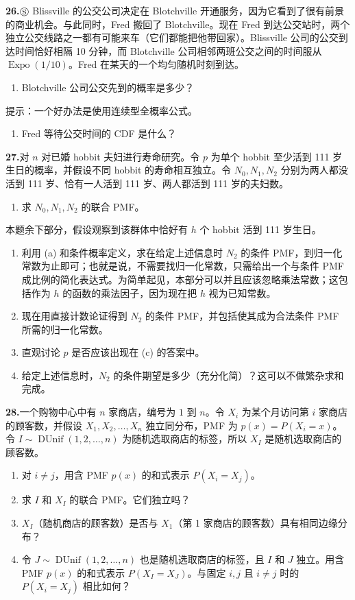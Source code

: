 \documentclass[UTF8,12pt,a4paper,fontset=fandol]{ctexart}
\begin{document}
\noindent\textbf{26.}\quad $\circledS$ Blissville 的公交公司决定在 Blotchville 开通服务，因为它看到了很有前景的商业机会。与此同时，Fred 搬回了 Blotchville。现在 Fred 到达公交站时，两个独立公交线路之一都有可能来车（它们都能把他带回家）。Blissville 公司的公交到达时间恰好相隔 10 分钟，而 Blotchville 公司相邻两班公交之间的时间服从 $\operatorname{Expo}(1/10)$。Fred 在某天的一个均匀随机时刻到达。
\begin{enumerate}
  \item[(a)] Blotchville 公司公交先到的概率是多少？
\end{enumerate}
提示：一个好办法是使用连续型全概率公式。
\begin{enumerate}
  \item[(b)] Fred 等待公交时间的 CDF 是什么？
\end{enumerate}

\noindent\textbf{27.}\quad 对 $n$ 对已婚 hobbit 夫妇进行寿命研究。令 $p$ 为单个 hobbit 至少活到 111 岁生日的概率，并假设不同 hobbit 的寿命相互独立。令 $N_0,N_1,N_2$ 分别为两人都没活到 111 岁、恰有一人活到 111 岁、两人都活到 111 岁的夫妇数。
\begin{enumerate}
  \item[(a)] 求 $N_0,N_1,N_2$ 的联合 PMF。
\end{enumerate}
本题余下部分，假设观察到该群体中恰好有 $h$ 个 hobbit 活到 111 岁生日。
\begin{enumerate}
  \item[(b)] 利用 (a) 和条件概率定义，求在给定上述信息时 $N_2$ 的条件 PMF，到归一化常数为止即可；也就是说，不需要找归一化常数，只需给出一个与条件 PMF 成比例的简化表达式。为简单起见，本部分可以并且应该忽略乘法常数；这包括作为 $h$ 的函数的乘法因子，因为现在把 $h$ 视为已知常数。
  \item[(c)] 现在用直接计数论证得到 $N_2$ 的条件 PMF，并包括使其成为合法条件 PMF 所需的归一化常数。
  \item[(d)] 直观讨论 $p$ 是否应该出现在 (c) 的答案中。
  \item[(e)] 给定上述信息时，$N_2$ 的条件期望是多少（充分化简）？这可以不做繁杂求和完成。
\end{enumerate}

\noindent\textbf{28.}\quad 一个购物中心中有 $n$ 家商店，编号为 $1$ 到 $n$。令 $X_i$ 为某个月访问第 $i$ 家商店的顾客数，并假设 $X_1,X_2,\ldots,X_n$ 独立同分布，PMF 为 $p(x)=P(X_i=x)$。令 $I\sim \operatorname{DUnif}(1,2,\ldots,n)$ 为随机选取商店的标签，所以 $X_I$ 是随机选取商店的顾客数。
\begin{enumerate}
  \item[(a)] 对 $i\ne j$，用含 PMF $p(x)$ 的和式表示 $P(X_i=X_j)$。
  \item[(b)] 求 $I$ 和 $X_I$ 的联合 PMF。它们独立吗？
  \item[(c)] $X_I$（随机商店的顾客数）是否与 $X_1$（第 1 家商店的顾客数）具有相同边缘分布？
  \item[(d)] 令 $J\sim \operatorname{DUnif}(1,2,\ldots,n)$ 也是随机选取商店的标签，且 $I$ 和 $J$ 独立。用含 PMF $p(x)$ 的和式表示 $P(X_I=X_J)$。与固定 $i,j$ 且 $i\ne j$ 时的 $P(X_i=X_j)$ 相比如何？
\end{enumerate}
\end{document}
